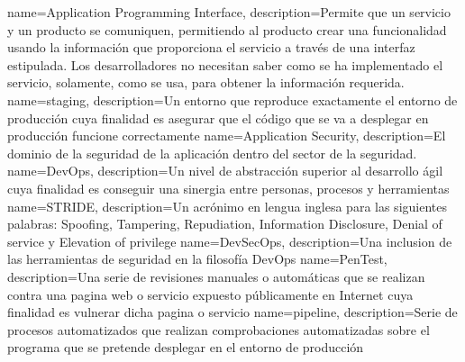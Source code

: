{
        name=Application Programming Interface, description={Permite que un
        servicio y un producto se comuniquen, permitiendo al producto crear una
        funcionalidad usando la información que proporciona el servicio a través
        de una interfaz estipulada.  Los desarrolladores no necesitan saber como
        se ha implementado el servicio, solamente, como se usa, para obtener la
        información requerida.}
}
{
        name=staging,
        description={Un entorno que reproduce exactamente el entorno de producción cuya finalidad es asegurar que el código que se va a desplegar en producción funcione correctamente}
}
{
        name=Application Security,
        description={El dominio de la seguridad de la aplicación dentro del 
        sector de la seguridad.}
}
{
        name=DevOps,
        description={Un nivel de abstracción superior al desarrollo ágil cuya
        finalidad es conseguir una sinergia entre personas, procesos y
        herramientas}
}
{
        name=STRIDE,
        description={Un acrónimo en lengua inglesa para las siguientes palabras:
        Spoofing, Tampering, Repudiation, Information Disclosure, Denial of
        service y Elevation of privilege}
}
{
        name=DevSecOps,
        description={Una inclusion de las herramientas de seguridad en la
        filosofía DevOps}
}
{
        name=PenTest,
        description={Una serie de revisiones manuales o automáticas que se
        realizan contra una pagina web o servicio expuesto públicamente en
        Internet cuya
        finalidad es vulnerar dicha pagina o servicio}
}
{
        name=pipeline,
        description={Serie de procesos automatizados que realizan comprobaciones automatizadas sobre el programa que se pretende desplegar en el entorno de producción}
}

